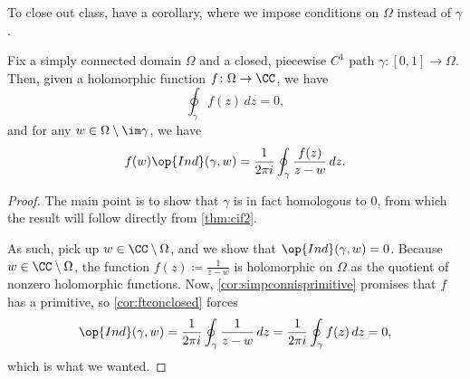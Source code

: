 \documentclass[../notes.tex]{subfiles}
\begin{document}
To close out class, have a corollary, where we impose conditions on $\Omega$ instead of $\gamma$.
\begin{corollary} \label{cor:cifhomotopy}
	Fix a simply connected domain $\Omega$ and a closed, piecewise $C^1$ path $\gamma\colon [0,1]\to\Omega$. Then, given a holomorphic function $f\colon \Omega\to\CC$, we have
	\[\oint_\gamma f(z)\,dz=0,\]
	and for any $w\in\Omega\setminus\im\gamma$, we have
	\[f(w)\op{Ind}(\gamma,w)=\frac1{2\pi i}\oint_\gamma\frac{f(z)}{z-w}\,dz.\]
\end{corollary}
\begin{proof}
	The main point is to show that $\gamma$ is in fact homologous to $0$, from which the result will follow directly from \autoref{thm:cif2}.

	As such, pick up $w\in\CC\setminus\Omega$, and we show that $\op{Ind}(\gamma,w)=0$. Because $w\in\CC\setminus\Omega$, the function $f(z)\coloneqq \frac1{z-w}$ is holomorphic on $\Omega$ as the quotient of nonzero holomorphic functions. Now, \autoref{cor:simpconnisprimitive} promises that $f$ has a primitive, so \autoref{cor:ftconclosed} forces
	\[\op{Ind}(\gamma,w)=\frac1{2\pi i}\oint_\gamma\frac1{z-w}\,dz=\frac1{2\pi i}\oint_\gamma f(z)\,dz=0,\]
	which is what we wanted.
\end{proof}
\end{document}

